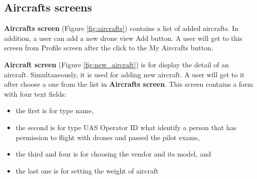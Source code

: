 \subsection{Aircrafts screens}\label{subsec:aircrafts-screens}
\textbf{Aircrafts screen} (Figure \ref{fig:aircrafts}) contains a list of added aircrafts.
In addition, a user can add a new drone view Add button.
A user will get to this screen from Profile screen after the click to the My Aircrafts button.

\textbf{Aircraft screen} (Figure \ref{fig:new_aircraft}) is for display the detail of an aircraft.
Simultaneously, it is used for adding new aircraft.
A user will get to it after choose a one from the list in \textbf{Aircrafts screen}.
This screen contains a form with four text fields:
\begin{itemize}
    \item the first is for type name,
    \item the second is for type UAS Operator ID what identify a person that has permission to flight with drones and passed the pilot exams,
    \item the third and four is for choosing the vendor and its model, and
    \item the last one is for setting the weight of aircraft
\end{itemize}


